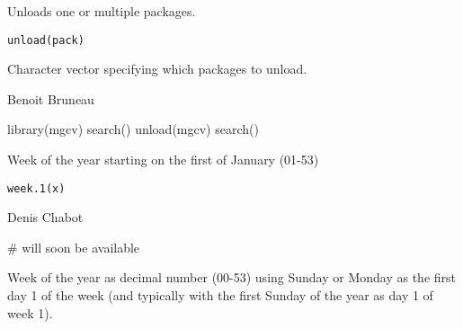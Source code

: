 \documentclass[a4paper]{book}
\begin{document}
\newpage
{}
%
\begin{Description}\relax
Unloads one or multiple packages.
\end{Description}
%
\begin{Usage}
\begin{verbatim}
unload(pack)
\end{verbatim}
\end{Usage}
%
\begin{Arguments}
\begin{ldescription}
\item[\code{pack}] Character vector specifying which packages to unload.

\end{ldescription}
\end{Arguments}
%
\begin{Author}\relax
Benoit Bruneau
\end{Author}
%
\begin{Examples}
\begin{ExampleCode}
library(mgcv)
search()
unload(mgcv)
search()
\end{ExampleCode}
\end{Examples}
\newpage
{}
%
\begin{Description}\relax
 Week of the year starting on the first of January (01-53)
\end{Description}
%
\begin{Usage}
\begin{verbatim}
week.1(x)
\end{verbatim}
\end{Usage}
%
\begin{Arguments}
\begin{ldescription}
\item[\code{x}] 


\end{ldescription}
\end{Arguments}
%
\begin{Author}\relax
Denis Chabot
\end{Author}
%
\begin{Examples}
\begin{ExampleCode}
# will soon be available
\end{ExampleCode}
\end{Examples}
\newpage
{}
%
\begin{Description}\relax
Week of the year as decimal number (00-53) using Sunday or Monday as 
the first day 1 of the week (and typically with the first Sunday of the year as day 1 of week 1).
\end{Description}
\end{document}
